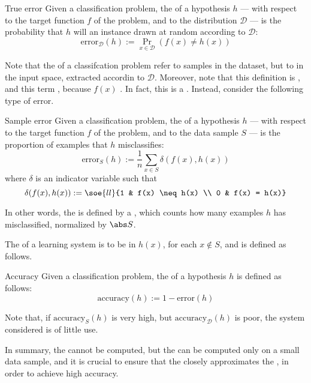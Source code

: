 \documentclass[a4paper, 12pt]{report}
\begin{document}
    \begin{frameddefn}{True error}
        Given a classification problem, the  of a hypothesis $h$ --- with respect to the target function $f$ of the problem, and to the distribution $\mathcal D$ --- is the probability that $h$ will  an instance drawn at random according to $\mathcal D$: $$\mathrm{error}_\mathcal D (h) := \Pr_{x \in \mathcal D}{(f(x) \neq h(x))}$$
    \end{frameddefn}

    Note that the  of a classifcation problem  refer to samples in the dataset, but to  in the input space, extracted accordin to $\mathcal D$. Moreover, note that this definition is , and this term , because $f(x)$ . In fact, this is a . Instead, consider the following type of error.

    \begin{frameddefn}{Sample error}
        Given a classification problem, the  of a hypothesis $h$ --- with respect to the target function $f$ of the problem, and to the data sample $S$ --- is the proportion of examples that $h$ misclassifies: $$\mathrm{error}_S(h) := \dfrac{1}{n} \sum_{x \in S}{\delta(f(x), h(x))}$$ where $\delta$ is an indicator variable such that $$\delta(f(x), h(x)) := \soe{ll}{1 & f(x) \neq h(x) \\ 0 & f(x) = h(x)}$$
    \end{frameddefn}

    In other words, the  is defined by a , which counts how many examples $h$ has misclassified, normalized by $\abs S$.

    The  of a learning system is to be  in $h(x)$, for each $x \notin S$, and  is defined as follows.

    \begin{frameddefn}{Accuracy}
        Given a classification problem, the  of a hypothesis $h$ is defined as follows: $$\mathrm{accuracy}(h) := 1 - \mathrm{error}(h)$$
    \end{frameddefn}

    Note that, if $\mathrm{accuracy}_S(h)$ is very high, but $\mathrm{accuracy}_\mathcal D(h)$ is poor, the system considered is of little use.

    In summary, the  cannot be computed, but the  can be computed only on a small data sample, and it is crucial to ensure that the  closely approximates the , in order to achieve high accuracy.
\end{document}
